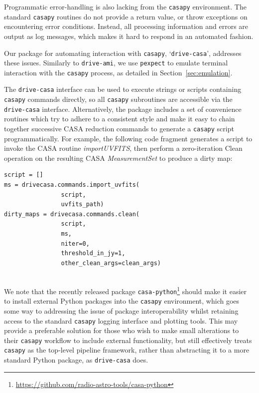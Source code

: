 \documentclass[5p,authoryear]{elsarticle}
\begin{document}
Programmatic error-handling is also lacking from the \texttt{casapy} environment. 
The standard \texttt{casapy} routines do not provide a return value, or throw exceptions on encountering error conditions. 
Instead, all processing information and errors are output as log messages, which makes it hard to respond in an automated fashion.

Our package for automating interaction with \texttt{casapy}, `\texttt{drive-casa}', addresses these issues.
Similarly to \texttt{drive-ami}, we use \texttt{pexpect} to emulate terminal interaction with the \texttt{casapy} process, as detailed in Section~\ref{sec:emulation}. 

The \texttt{drive-casa} interface can be used to execute strings or scripts containing \texttt{casapy} commands directly, so all \texttt{casapy} subroutines are accessible via the \texttt{drive-casa} interface. 
Alternatively, the package includes a set of convenience routines which try to adhere to a consistent style and make it easy to chain together successive CASA reduction commands to generate a \texttt{casapy} script programmatically.
For example, the following code fragment generates a script to invoke the CASA routine \mbox{\textit{importUVFITS}}, then perform a zero-iteration Clean operation on the resulting CASA \textit{MeasurementSet}
to produce a dirty map:


\begin{Verbatim}[samepage=true]
script = []
ms = drivecasa.commands.import_uvfits(
                script, 
                uvfits_path)
dirty_maps = drivecasa.commands.clean(
                script, 
                ms, 
                niter=0, 
                threshold_in_jy=1,
                other_clean_args=clean_args)
                
\end{Verbatim}

We note that the recently released package \texttt{casa-python}\footnote{%
\url{https://github.com/radio-astro-tools/casa-python}
}
should make it easier to install external Python packages into the \texttt{casapy} environment, which goes some way to addressing the issue of package interoperability whilst retaining access to the standard \texttt{casapy} logging interface and plotting tools. 
This may provide a preferable solution for those who wish to make small alterations to their \texttt{casapy} workflow to include external functionality, but still effectively treats \texttt{casapy} as the top-level pipeline framework, rather than abstracting it to a more standard Python package, as \texttt{drive-casa} does.
\end{document}
